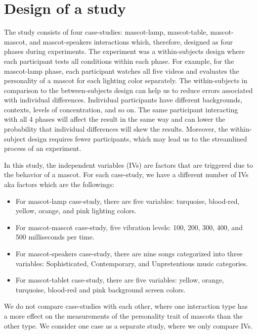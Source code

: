 \section{Design of a study}
\label{sec:design-of-a-study}

The study consists of four case-studies: mascot-lamp, mascot-table, mascot-mascot, and mascot-speakers
interactions which, therefore, designed as four phases during experiments.
The experiment was a within-subjects design where each participant tests all conditions within each phase.
For example, for the mascot-lamp phase, each participant watches all five videos and
evaluates the personality of a mascot for each lighting color separately.
The within-subjects in comparison to the between-subjects design can help us to
reduce errors associated with individual differences.
Individual participants have different backgrounds, contexts, levels of concentration, and so on.
The same participant interacting with all 4 phases will affect the result in the same way
and can lower the probability that individual differences will skew the results.
Moreover, the within-subject design requires fewer participants, which may lead
us to the streamlined process of an experiment.

In this study, the independent variables (IVs) are factors that are triggered due to the behavior of a mascot.
For each case-study, we have a different number of IVs aka factors which are the followings:
\begin{itemize}
  \item For mascot-lamp case-study, there are five variables: turquoise, blood-red,
  yellow, orange, and pink lighting colors.
  \item For mascot-mascot case-study, five vibration levels: 100, 200, 300, 400, and 500 milliseconds per time.
  \item For mascot-speakers case-study, there are nine songs categorized into three variables:
        Sophisticated, Contemporary, and Unpretentious music categories.
   \item For mascot-tablet case-study, there are five variables: yellow, orange, turquoise,
        blood-red and pink background screen colors.
\end{itemize}

We do not compare case-studies with each other, where one interaction type
has a more effect on the measurements of the personality trait of mascots than the other type.
We consider one case as a separate study, where we only compare IVs.

